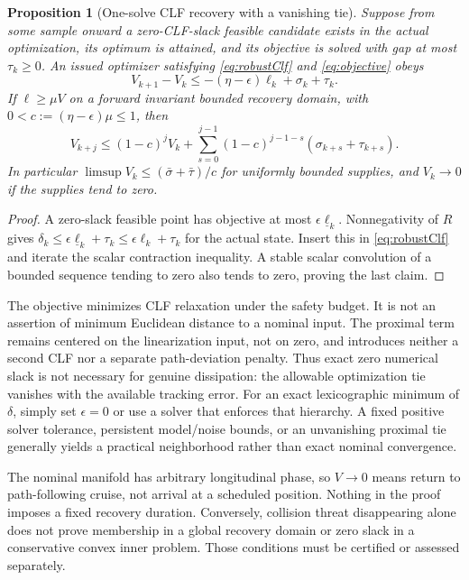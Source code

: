 \documentclass[10pt,letterpaper]{article}
\newtheorem{proposition}{Proposition}
\begin{document}
\begin{proposition}[One-solve CLF recovery with a vanishing tie]\label{prop:clf}
Suppose from some sample onward a zero-CLF-slack feasible candidate exists in
the actual optimization, its optimum is attained, and its objective is solved
with gap at most $\tau_k\ge0$. An issued optimizer satisfying
\eqref{eq:robustClf} and \eqref{eq:objective} obeys
\begin{equation}\label{eq:recovery}
V_{k+1}-V_k\le-(\eta-\epsilon)\ell_k+\sigma_k+\tau_k.
\end{equation}
If $\ell\ge\mu V$ on a forward invariant bounded recovery domain, with
$0<c:=(\eta-\epsilon)\mu\le1$, then
\begin{equation}\label{eq:iss}
V_{k+j}\le(1-c)^jV_k+
\sum_{s=0}^{j-1}(1-c)^{j-1-s}(\sigma_{k+s}+\tau_{k+s}).
\end{equation}
In particular $\limsup V_k\le(\bar\sigma+\bar\tau)/c$ for uniformly bounded
supplies, and $V_k\to0$ if the supplies tend to zero.
\end{proposition}
\begin{proof}
A zero-slack feasible point has objective at most
$\epsilon\underline\ell_k$. Nonnegativity of $R$ gives
$\delta_k\le\epsilon\underline\ell_k+\tau_k\le\epsilon\ell_k+\tau_k$
for the actual state. Insert this in \eqref{eq:robustClf} and iterate the scalar
contraction inequality. A stable scalar convolution of a bounded sequence
tending to zero also tends to zero, proving the last claim.
\end{proof}
The objective minimizes CLF relaxation under the safety budget. It is not
an assertion of minimum Euclidean distance to a nominal input. The proximal
term remains centered on the linearization input, not on zero, and introduces
neither a second CLF nor a separate path-deviation penalty.
Thus exact zero numerical slack is not necessary for genuine dissipation:
the allowable optimization tie vanishes with the available tracking error.
For an exact lexicographic minimum of $\delta$, simply set $\epsilon=0$ or
use a solver that enforces that hierarchy. A fixed positive solver tolerance,
persistent model/noise bounds, or an unvanishing proximal tie generally yields
a practical neighborhood rather than exact nominal convergence.

The nominal manifold has arbitrary longitudinal phase, so $V\to0$ means
return to path-following cruise, not arrival at a scheduled position. Nothing
in the proof imposes a fixed recovery duration. Conversely, collision threat
disappearing alone does not prove membership in a global recovery domain or
zero slack in a conservative convex inner problem. Those conditions must be
certified or assessed separately.
\end{document}
